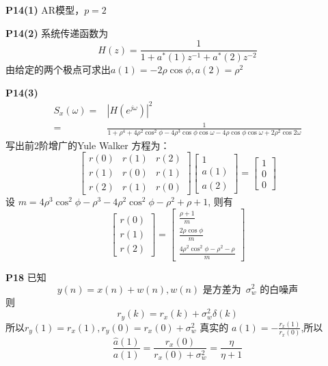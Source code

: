 \documentclass{article}
\begin{document}
\textbf{P14(1)} AR模型，$p=2$

\textbf{P14(2)} 系统传递函数为
\begin{equation}
H(z)=\frac{1}{1+a^*(1)z^{-1}+a^*(2)z^{-2}}
\end{equation}
由给定的两个极点可求出$a(1)=-2\rho\cos\phi,a(2)=\rho^2$ 

\textbf{P14(3)}
\begin{align}
S_x(\omega)=&|H(e^{j\omega})|^2\\
=&\frac{1}{1+\rho^4+4\rho^2\cos^2\phi-4\rho^3 \cos\phi\cos\omega-4\rho\cos\phi\cos\omega+2\rho^2\cos 2\omega}
\end{align}
写出前2阶增广的Yule Walker 方程为：
\begin{equation}
\begin{bmatrix}
r(0) & r(1) & r(2)\\
r(1) & r(0) & r(1) \\
r(2) & r(1) & r(0)
\end{bmatrix}
\begin{bmatrix}
1 \\ a(1) \\ a(2)
\end{bmatrix}=\begin{bmatrix}
1 \\ 0 \\ 0
\end{bmatrix}
\end{equation}
设 $m=4 \rho ^3 \cos ^2\phi-\rho ^3-4 \rho ^2  \cos ^2\phi -\rho ^2+\rho +1$,
则有
\begin{equation}
\begin{bmatrix}
r(0)\\r(1)\\r(2)
\end{bmatrix}=
\begin{bmatrix}
\frac{\rho+1}{m}\\ \frac{2\rho\cos\phi}{m} \\ \frac{4 \rho ^2\cos^2\phi  -\rho ^2-\rho}{m}
\end{bmatrix}
\end{equation}

\textbf{P18}
已知
\begin{equation}\label{eq:1}
y(n)=x(n)+w(n), w(n) \text{ 是方差为 }\, \sigma_w^2 \text{ 的白噪声}
\end{equation}
则
\begin{equation}
r_y(k)=r_x(k)+\sigma_w^2\delta(k)
\end{equation}
所以$r_y(1)=r_x(1),r_y(0)=r_x(0)+\sigma_w^2$
真实的
$a(1)=-\frac{r_x(1)}{r_x(0)}$,所以
\begin{equation}
\frac{\hat{a}(1)}{a(1)}=\frac{r_x(0)}{r_x(0)+\sigma_w^2}=\frac{\eta}{\eta+1}
\end{equation}
\end{document}
